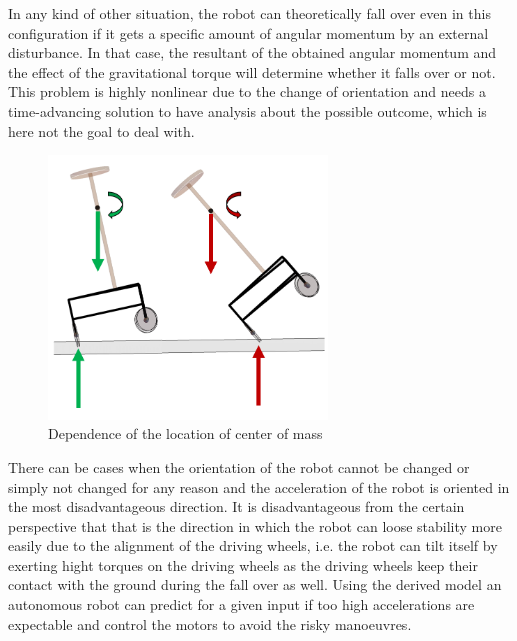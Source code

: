 \documentclass[12pt,english]{article}
\begin{document}
In any kind of other situation, the robot can theoretically fall over even in this configuration if it gets a specific amount of angular momentum by an external disturbance. In that case, the resultant of the obtained angular momentum and the effect of the gravitational torque will determine whether it falls over or not. This problem is highly nonlinear due to the change of orientation and needs a time-advancing solution to have analysis about the possible outcome, which is here not the goal to deal with.
\begin{figure}[htb!]
	\centering
	\includegraphics[height=7cm]{figures/fallover_ppt}
	\caption{Dependence of the location of center of mass}
	\label{fallover_ppt}
\end{figure}

There can be cases when the orientation of the robot cannot be changed or simply not changed for any reason and the acceleration of the robot is oriented in the most disadvantageous direction. It is disadvantageous from the certain perspective that that is the direction in which the robot can loose stability more easily due to the alignment of the driving wheels, i.e. the robot can tilt itself by exerting hight torques on the driving wheels as the driving wheels keep their contact with the ground during the fall over as well. Using the derived model an autonomous robot can predict for a given input if too high accelerations are expectable and control the motors to avoid the risky manoeuvres. 
\end{document}
